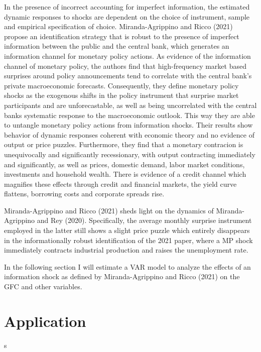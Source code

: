 \documentclass[10pt,a4paper,draft]{article}
\begin{document}
In the presence of incorrect accounting for imperfect information, the estimated dynamic responses to shocks are dependent on the choice of instrument, sample and empirical specification of choice. Miranda-Agrippino and Ricco (2021) propose an identification strategy that is robust to the presence of imperfect information between the public and the central bank, which generates an information channel for monetary policy actions. 
As evidence of the information channel of monetary policy, the authors find that high-frequency market based surprises around policy announcements tend to correlate with the central bank's private macroeconomic forecasts. Consequently, they define monetary policy shocks as the exogenous shifts in the policy instrument that surprise market participants and are unforecastable, as well as being uncorrelated with the central banks systematic response to the macroeconomic outlook.  This way they are able to untangle monetary policy actions from information shocks. 
Their results show behavior of dynamic responses coherent with economic theory and no evidence of output or price puzzles. Furthermore, they find that a monetary contracion is unequivocally and significantly recessionary, with output contracting immediately and significantly, as well as prices, domestic demand, labor market conditions, investments and household wealth. There is evidence of a credit channel which magnifies these effects through credit and financial markets, the yield curve flattens, borrowing costs and corporate spreads rise.





Miranda-Agrippino and Ricco (2021) sheds light on the dynamics of Miranda-Agrippino and Rey (2020). Specifically, the average monthly surprise instrument employed in the latter still shows a slight price puzzle which entirely disappears in the informationally robust identification of the 2021 paper, where a MP shock immediately contracts industrial production and raises the unemployment rate. 



In the following section I will estimate a VAR model to analyze the effects of an information shock as defined by Miranda-Agrippino and Ricco (2021) on the GFC and other variables. 

\section{Application}
s
\end{document}
